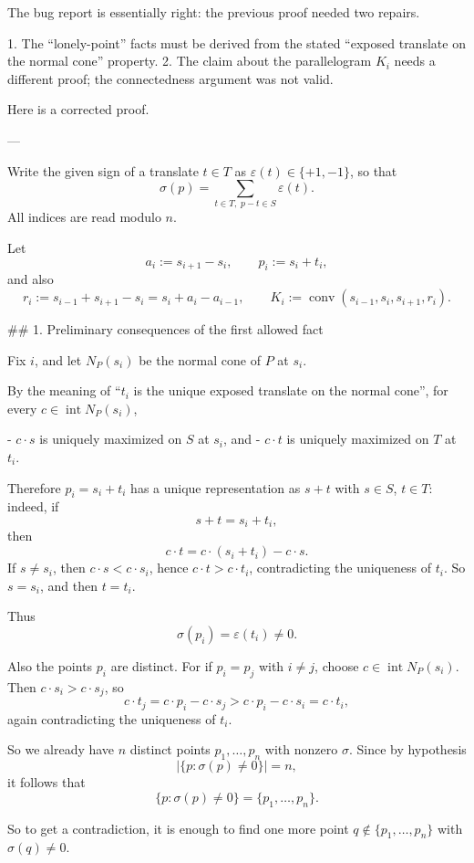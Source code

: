 The bug report is essentially right: the previous proof needed two repairs.

1. The “lonely-point” facts must be derived from the stated “exposed translate on the normal cone” property.
2. The claim about the parallelogram \(K_i\) needs a different proof; the connectedness argument was not valid.

Here is a corrected proof.

---

Write the given sign of a translate \(t\in T\) as \(\varepsilon(t)\in\{+1,-1\}\), so that
\[
\sigma(p)=\sum_{t\in T,\;p-t\in S}\varepsilon(t).
\]
All indices are read modulo \(n\).

Let
\[
a_i:=s_{i+1}-s_i,\qquad
p_i:=s_i+t_i,
\]
and also
\[
r_i:=s_{i-1}+s_{i+1}-s_i=s_i+a_i-a_{i-1},
\qquad
K_i:=\operatorname{conv}(s_{i-1},s_i,s_{i+1},r_i).
\]

## 1. Preliminary consequences of the first allowed fact

Fix \(i\), and let \(N_P(s_i)\) be the normal cone of \(P\) at \(s_i\).

By the meaning of “\(t_i\) is the unique exposed translate on the normal cone”, for every \(c\in \operatorname{int}N_P(s_i)\),

- \(c\cdot s\) is uniquely maximized on \(S\) at \(s_i\), and
- \(c\cdot t\) is uniquely maximized on \(T\) at \(t_i\).

Therefore \(p_i=s_i+t_i\) has a unique representation as \(s+t\) with \(s\in S\), \(t\in T\): indeed, if
\[
s+t=s_i+t_i,
\]
then
\[
c\cdot t=c\cdot(s_i+t_i)-c\cdot s.
\]
If \(s\neq s_i\), then \(c\cdot s<c\cdot s_i\), hence \(c\cdot t>c\cdot t_i\), contradicting the uniqueness of \(t_i\). So \(s=s_i\), and then \(t=t_i\).

Thus
\[
\sigma(p_i)=\varepsilon(t_i)\neq 0.
\]

Also the points \(p_i\) are distinct. For if \(p_i=p_j\) with \(i\neq j\), choose \(c\in \operatorname{int}N_P(s_i)\). Then \(c\cdot s_i>c\cdot s_j\), so
\[
c\cdot t_j
= c\cdot p_i-c\cdot s_j
> c\cdot p_i-c\cdot s_i
= c\cdot t_i,
\]
again contradicting the uniqueness of \(t_i\).

So we already have \(n\) distinct points \(p_1,\dots,p_n\) with nonzero \(\sigma\). Since by hypothesis
\[
\bigl|\{p:\sigma(p)\neq 0\}\bigr|=n,
\]
it follows that
\[
\{p:\sigma(p)\neq 0\}=\{p_1,\dots,p_n\}.
\]

So to get a contradiction, it is enough to find one more point \(q\notin\{p_1,\dots,p_n\}\) with \(\sigma(q)\neq 0\).

